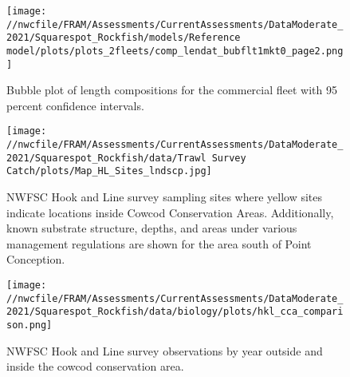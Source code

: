 \documentclass[11pt,
  english,
  a4paper,
]{article}
\begin{document}
\tagmcend\tagstructend


\begin{figure}
\centering
\texttt{[image: //nwcfile/FRAM/Assessments/CurrentAssessments/DataModerate\_2021/Squarespot\_Rockfish/models/Reference model/plots/plots\_2fleets/comp\_lendat\_bubflt1mkt0\_page2.png]}
\caption{Bubble plot of length compositions for the commercial fleet with 95 percent confidence intervals.\label{fig:bubble-comm-len-data}}
\end{figure}

\tagmcend\tagstructend


\begin{figure}
\centering
\texttt{[image: //nwcfile/FRAM/Assessments/CurrentAssessments/DataModerate\_2021/Squarespot\_Rockfish/data/Trawl Survey Catch/plots/Map\_HL\_Sites\_lndscp.jpg]}
\caption{NWFSC Hook and Line survey sampling sites where yellow sites indicate locations inside Cowcod Conservation Areas. Additionally, known substrate structure, depths, and areas under various management regulations are shown for the area south of Point Conception.\label{fig:hkl-sites}}
\end{figure}

\tagmcend\tagstructend


\begin{figure}
\centering
\texttt{[image: //nwcfile/FRAM/Assessments/CurrentAssessments/DataModerate\_2021/Squarespot\_Rockfish/data/biology/plots/hkl\_cca\_comparison.png]}
\caption{NWFSC Hook and Line survey observations by year outside and inside the cowcod conservation area.\label{fig:hkl-cca}}
\end{figure}

\tagmcend\tagstructend
\end{document}
